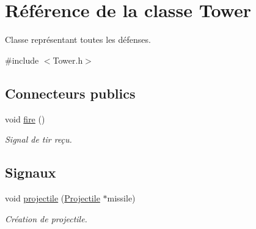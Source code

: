 \hypertarget{classTower}{
\section{Référence de la classe Tower}
\label{classTower}
}


Classe représentant toutes les défenses.  




{\ttfamily \#include $<$Tower.h$>$}

\subsection*{Connecteurs publics}
\begin{DoxyCompactItemize}
\item 
void \hyperlink{classTower_aa0c9c780f48cffacd3da6877f5d4fdc2}{fire} ()
\begin{DoxyCompactList}\small\item\em Signal de tir reçu. \end{DoxyCompactList}\end{DoxyCompactItemize}
\subsection*{Signaux}
\begin{DoxyCompactItemize}
\item 
void \hyperlink{classTower_aa303fa5bcabcf781c459d129b01ecfe8}{projectile} (\hyperlink{classProjectile}{Projectile} $\ast$missile)
\begin{DoxyCompactList}\small\item\em Création de projectile. \end{DoxyCompactList}\end{DoxyCompactItemize}
